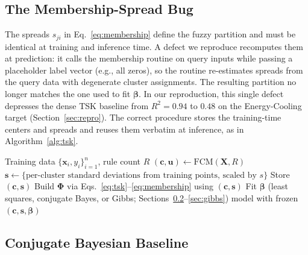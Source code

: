 \documentclass[review,1p,times]{elsarticle}
\begin{document}
\subsection{The Membership-Spread Bug}
\label{sec:bug}

The spreads $s_{ji}$ in Eq.~\eqref{eq:membership} define the fuzzy partition and must be identical at training and inference time. A defect we reproduce recomputes them at prediction: it calls the membership routine on query inputs while passing a placeholder label vector (e.g., all zeros), so the routine re-estimates spreads from the query data with degenerate cluster assignments. The resulting partition no longer matches the one used to fit $\boldsymbol{\beta}$. In our reproduction, this single defect depresses the dense TSK baseline from $R^2=0.94$ to $0.48$ on the Energy-Cooling target (Section~\ref{sec:repro}). The correct procedure stores the training-time centers and spreads and reuses them verbatim at inference, as in Algorithm~\ref{alg:tsk}.

\begin{algorithm}[tbhp]
\caption{Corrected TSK training and inference}
\label{alg:tsk}
\begin{algorithmic}[1]
\Require Training data $\{\mathbf{x}_i,y_i\}_{i=1}^n$, rule count $R$
\State $(\mathbf{c},\mathbf{u}) \gets \mathrm{FCM}(\mathbf{X}, R)$ 
\State $\mathbf{s} \gets \{\text{per-cluster standard deviations from training points, scaled by } s\}$
\State Store $(\mathbf{c},\mathbf{s})$ 
\State Build $\boldsymbol{\Phi}$ via Eqs.~\eqref{eq:tsk}--\eqref{eq:membership} using $(\mathbf{c},\mathbf{s})$
\State Fit $\boldsymbol{\beta}$ (least squares, conjugate Bayes, or Gibbs; Sections~\ref{sec:conj}--\ref{sec:gibbs})
\State \Return model with frozen $(\mathbf{c},\mathbf{s},\boldsymbol{\beta})$
\end{algorithmic}
\end{algorithm}

\subsection{Conjugate Bayesian Baseline}
\label{sec:conj}
\end{document}
